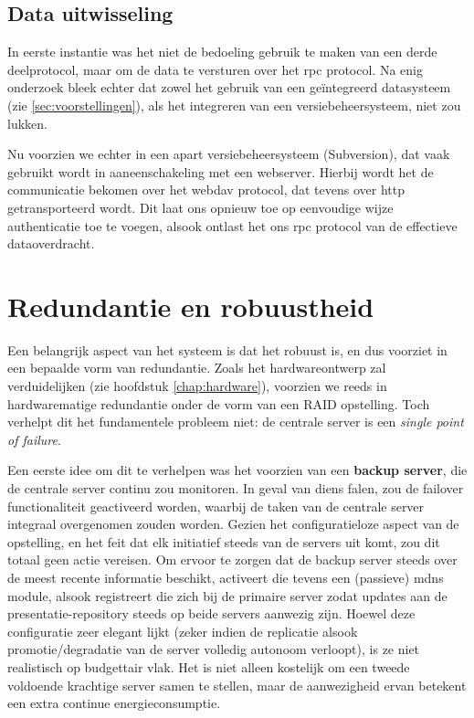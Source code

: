 \subsection{Data uitwisseling}

In eerste instantie was het niet de bedoeling gebruik te maken van een derde deelprotocol, maar om de data te versturen over het \ac{rpc} protocol. Na enig onderzoek bleek echter dat zowel het gebruik van een geïntegreerd datasysteem (zie \ref{sec:voorstellingen}), als het integreren van een versiebeheersysteem, niet zou lukken.

Nu voorzien we echter in een apart versiebeheersysteem (Subversion), dat vaak gebruikt wordt in aaneenschakeling met een webserver. Hierbij wordt het de communicatie bekomen over het \ac{webdav} protocol, dat tevens over \ac{http} getransporteerd wordt. Dit laat ons opnieuw toe op eenvoudige wijze authenticatie toe te voegen, alsook ontlast het ons \ac{rpc} protocol van de effectieve dataoverdracht.

\section{Redundantie en robuustheid}
\label{sec:redundantie}

Een belangrijk aspect van het systeem is dat het robuust is, en dus voorziet in een bepaalde vorm van redundantie. Zoals het hardwareontwerp zal verduidelijken (zie hoofdstuk \ref{chap:hardware}), voorzien we reeds in hardwarematige redundantie onder de vorm van een RAID opstelling. Toch verhelpt dit het fundamentele probleem niet: de centrale server is een \emph{single point of failure}.

Een eerste idee om dit te verhelpen was het voorzien van een \textbf{backup server}, die de centrale server continu zou monitoren. In geval van diens falen, zou de failover functionaliteit geactiveerd worden, waarbij de taken van de centrale server integraal overgenomen zouden worden. Gezien het configuratieloze aspect van de opstelling, en het feit dat elk initiatief steeds van de servers uit komt, zou dit totaal geen actie vereisen. Om ervoor te zorgen dat de backup server steeds over de meest recente informatie beschikt, activeert die tevens een (passieve) \ac{mdns} module, alsook registreert die zich bij de primaire server zodat updates aan de presentatie-repository steeds op beide servers aanwezig zijn.
Hoewel deze configuratie zeer elegant lijkt (zeker indien de replicatie alsook promotie/degradatie van de server volledig autonoom verloopt), is ze niet realistisch op budgettair vlak. Het is niet alleen kostelijk om een tweede voldoende krachtige server samen te stellen, maar de aanwezigheid ervan betekent een extra continue energieconsumptie.

